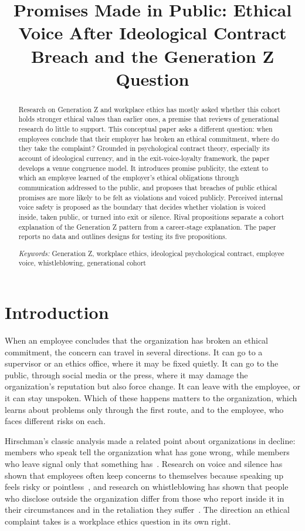 \documentclass[12pt,a4paper]{article}
\title{Promises Made in Public: Ethical Voice After Ideological Contract Breach and the Generation Z Question}
\author{}
\date{}
\theoremstyle{definition}
\begin{document}
\maketitle
\vspace{-2em}

\begin{abstract}
\noindent Research on Generation Z and workplace ethics has mostly asked whether this cohort holds stronger ethical values than earlier ones, a premise that reviews of generational research do little to support. This conceptual paper asks a different question: when employees conclude that their employer has broken an ethical commitment, where do they take the complaint? Grounded in psychological contract theory, especially its account of ideological currency, and in the exit-voice-loyalty framework, the paper develops a venue congruence model. It introduces promise publicity, the extent to which an employee learned of the employer's ethical obligations through communication addressed to the public, and proposes that breaches of public ethical promises are more likely to be felt as violations and voiced publicly. Perceived internal voice safety is proposed as the boundary that decides whether violation is voiced inside, taken public, or turned into exit or silence. Rival propositions separate a cohort explanation of the Generation Z pattern from a career-stage explanation. The paper reports no data and outlines designs for testing its five propositions.

\medskip
\noindent\textit{Keywords:} Generation Z, workplace ethics, ideological psychological contract, employee voice, whistleblowing, generational cohort
\end{abstract}

\section{Introduction}
When an employee concludes that the organization has broken an ethical commitment, the concern can travel in several directions. It can go to a supervisor or an ethics office, where it may be fixed quietly. It can go to the public, through social media or the press, where it may damage the organization's reputation but also force change. It can leave with the employee, or it can stay unspoken. Which of these happens matters to the organization, which learns about problems only through the first route, and to the employee, who faces different risks on each.

Hirschman's classic analysis made a related point about organizations in decline: members who speak tell the organization what has gone wrong, while members who leave signal only that something has~\citep{hirschman1970exit}. Research on voice and silence has shown that employees often keep concerns to themselves because speaking up feels risky or pointless~\citep{morrison2000organizational,milliken2003exploratory}, and research on whistleblowing has shown that people who disclose outside the organization differ from those who report inside it in their circumstances and in the retaliation they suffer~\citep{dworkin1998internal}. The direction an ethical complaint takes is a workplace ethics question in its own right.
\end{document}
